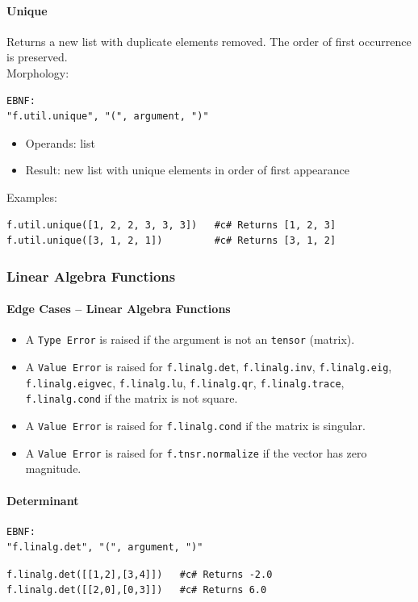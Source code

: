 \paragraph{Unique}
Returns a new list with duplicate elements removed. The order of first occurrence is preserved.\\
Morphology:
\begin{verbatim}
EBNF:
"f.util.unique", "(", argument, ")"
\end{verbatim}
\begin{itemize}
\item Operands: list
\item Result: new list with unique elements in order of first appearance
\end{itemize}
Examples:
\begin{verbatim}
f.util.unique([1, 2, 2, 3, 3, 3])   #c# Returns [1, 2, 3]
f.util.unique([3, 1, 2, 1])         #c# Returns [3, 1, 2]
\end{verbatim}

\subsubsection{Linear Algebra Functions}

\paragraph{Edge Cases -- Linear Algebra Functions}
\begin{itemize}
\item A \texttt{Type Error} is raised if the argument is not an \texttt{tensor} (matrix).
\item A \texttt{Value Error} is raised for \texttt{f.linalg.det}, \texttt{f.linalg.inv}, \texttt{f.linalg.eig}, \texttt{f.linalg.eigvec}, \texttt{f.linalg.lu}, \texttt{f.linalg.qr}, \texttt{f.linalg.trace}, \texttt{f.linalg.cond} if the matrix is not square.
\item A \texttt{Value Error} is raised for \texttt{f.linalg.cond} if the matrix is singular.
\item A \texttt{Value Error} is raised for \texttt{f.tnsr.normalize} if the vector has zero magnitude.
\end{itemize}

\paragraph{Determinant}
\begin{verbatim}
EBNF:
"f.linalg.det", "(", argument, ")"
\end{verbatim}
\begin{verbatim}
f.linalg.det([[1,2],[3,4]])   #c# Returns -2.0
f.linalg.det([[2,0],[0,3]])   #c# Returns 6.0
\end{verbatim}

